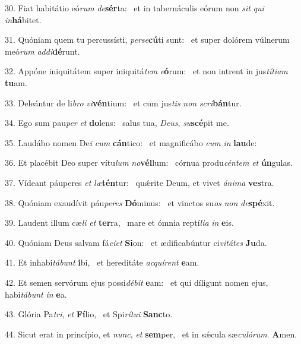 30. Fiat habitátio eó\textit{rum} \textit{de}\textbf{sér}ta: \ast\  et in tabernáculis eórum non \textit{sit} \textit{qui} \textit{in}\textbf{há}bitet.\

31. Quóniam quem tu percussísti, \textit{per}\textit{se}\textbf{cú}ti sunt: \ast\  et super dolórem vúlnerum meó\textit{rum} \textit{ad}\textit{di}\textbf{dé}runt.\

32. Appóne iniquitátem super iniquitá\textit{tem} \textit{e}\textbf{ó}rum: \ast\  et non intrent in jus\textit{tí}\textit{ti}\textit{am} \textbf{tu}am.\

33. Deleántur de li\textit{bro} \textit{vi}\textbf{vén}tium: \ast\  et cum jus\textit{tis} \textit{non} \textit{scri}\textbf{bán}tur.\

34. Ego sum pau\textit{per} \textit{et} \textbf{do}lens: \ast\  salus tua, \textit{De}\textit{us}, \textit{su}\textbf{scé}pit me.\

35. Laudábo nomen De\textit{i} \textit{cum} \textbf{cán}tico: \ast\  et magnificábo \textit{e}\textit{um} \textit{in} \textbf{lau}de:\

36. Et placébit Deo super vítu\textit{lum} \textit{no}\textbf{vél}lum: \ast\  córnua produ\textit{cén}\textit{tem} \textit{et} \textbf{ún}gulas.\

37. Vídeant páuperes \textit{et} \textit{læ}\textbf{tén}tur: \ast\  quǽrite Deum, et vivet \textit{á}\textit{ni}\textit{ma} \textbf{ves}tra.\

38. Quóniam exaudívit páu\textit{pe}\textit{res} \textbf{Dó}minus: \ast\  et vinctos su\textit{os} \textit{non} \textit{de}\textbf{spé}xit.\

39. Laudent illum cæ\textit{li} \textit{et} \textbf{ter}ra, \ast\  mare et ómnia reptí\textit{li}\textit{a} \textit{in} \textbf{e}is.\

40. Quóniam Deus salvam fá\textit{ci}\textit{et} \textbf{Si}on: \ast\  et ædificabúntur ci\textit{vi}\textit{tá}\textit{tes} \textbf{Ju}da.\

41. Et inhabi\textit{tá}\textit{bunt} \textbf{i}bi, \ast\  et hereditáte \textit{ac}\textit{quí}\textit{rent} \textbf{e}am.\

42. Et semen servórum ejus possi\textit{dé}\textit{bit} \textbf{e}am: \ast\  et qui díligunt nomen ejus, habi\textit{tá}\textit{bunt} \textit{in} \textbf{e}a.\

43. Glória Pa\textit{tri}, \textit{et} \textbf{Fí}lio, \ast\  et Spi\textit{rí}\textit{tu}\textit{i} \textbf{Sanc}to.\

44. Sicut erat in princípio, et \textit{nunc}, \textit{et} \textbf{sem}per, \ast\  et in sǽcula sæ\textit{cu}\textit{ló}\textit{rum}. \textbf{A}men.\

